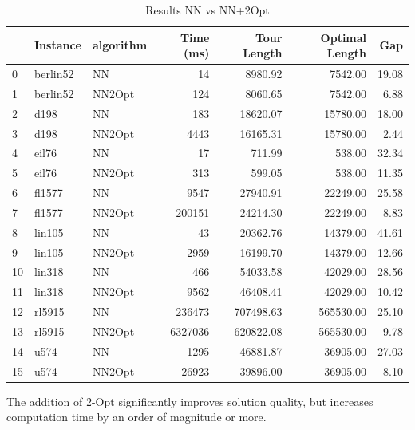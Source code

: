 \begin{table}
	\centering
	\caption{Results NN vs NN+2Opt}
	\begin{tabular}{lllrrrr}
		\toprule
		   & Instance & algorithm & Time (ms) & Tour Length & Optimal Length & Gap   \\
		\midrule
		0  & berlin52 & NN        & 14         & 8980.92        & 7542.00          & 19.08 \\
		1  & berlin52 & NN2Opt    & 124        & 8060.65        & 7542.00          & 6.88  \\
		2  & d198     & NN        & 183        & 18620.07       & 15780.00         & 18.00 \\
		3  & d198     & NN2Opt    & 4443       & 16165.31       & 15780.00         & 2.44  \\
		4  & eil76    & NN        & 17         & 711.99         & 538.00           & 32.34 \\
		5  & eil76    & NN2Opt    & 313        & 599.05         & 538.00           & 11.35 \\
		6  & fl1577   & NN        & 9547       & 27940.91       & 22249.00         & 25.58 \\
		7  & fl1577   & NN2Opt    & 200151     & 24214.30       & 22249.00         & 8.83  \\
		8  & lin105   & NN        & 43         & 20362.76       & 14379.00         & 41.61 \\
		9  & lin105   & NN2Opt    & 2959       & 16199.70       & 14379.00         & 12.66 \\
		10 & lin318   & NN        & 466        & 54033.58       & 42029.00         & 28.56 \\
		11 & lin318   & NN2Opt    & 9562       & 46408.41       & 42029.00         & 10.42 \\
		12 & rl5915   & NN        & 236473     & 707498.63      & 565530.00        & 25.10 \\
		13 & rl5915   & NN2Opt    & 6327036    & 620822.08      & 565530.00        & 9.78  \\
		14 & u574     & NN        & 1295       & 46881.87       & 36905.00         & 27.03 \\
		15 & u574     & NN2Opt    & 26923      & 39896.00       & 36905.00         & 8.10  \\
		\bottomrule
	\end{tabular}
\end{table}

The addition of 2-Opt significantly improves solution quality, but increases computation time by an order of magnitude or more.


